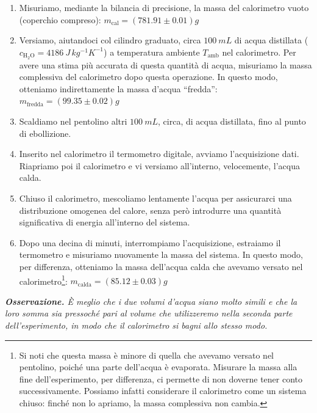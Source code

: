 \documentclass{article}
\begin{document}
\begin{enumerate}
    \item
        Misuriamo, mediante la bilancia di precisione, la massa del
        calorimetro vuoto (coperchio compreso):
        $m_\text{cal} = \left(781.91\pm0.01\right) \unit{g}$
    \item
        Versiamo, aiutandoci col cilindro graduato, circa $\qty{100}{mL}$
        di acqua distillata ($c_{\text{H}_2\text{O}}=\qty{4186}{J\,kg^{-1}K^{-1}}$)
        a temperatura ambiente $T_\text{amb}$ nel calorimetro.
        Per avere una stima più accurata di questa quantità di acqua,
        misuriamo la massa complessiva del calorimetro dopo questa operazione.
        In questo modo, otteniamo indirettamente la massa d'acqua “fredda”:
        $m_\text{fredda} = \left(99.35\pm0.02\right) \unit{g}$
    \item
        Scaldiamo nel pentolino altri $\qty{100}{mL}$, circa, di acqua distillata,
        fino al punto di ebollizione.
    \item
        Inserito nel calorimetro il termometro digitale, avviamo l'acquisizione dati.
        Riapriamo poi il calorimetro e vi versiamo all'interno,
        velocemente, l'acqua calda.
    \item
        Chiuso il calorimetro, mescoliamo lentamente l'acqua per assicurarci
        una distribuzione omogenea del calore, senza però introdurre una quantità
        significativa di energia all'interno del sistema.
    \item
        Dopo una decina di minuti, interrompiamo l'acquisizione, estraiamo il
        termometro e misuriamo nuovamente la massa del sistema.
        In questo modo, per differenza, otteniamo la massa dell'acqua calda che
        avevamo versato nel calorimetro\footnote{
        Si noti che questa massa è minore di quella che avevamo versato
        nel pentolino, poiché una parte dell'acqua è evaporata. Misurare la massa
        alla fine dell'esperimento, per differenza, ci permette di non doverne
        tener conto successivamente. Possiamo infatti considerare il calorimetro
        come un sistema chiuso: finché non lo apriamo, la massa complessiva
        non cambia.
        }:
        $m_\text{calda} = \left(85.12\pm0.03\right) \unit{g}$
\end{enumerate}

\emph{
\textbf{Osservazione.} È meglio che i due volumi d'acqua siano molto simili e che
la loro somma sia pressoché pari al volume che utilizzeremo nella seconda parte
dell'esperimento, in modo che il calorimetro si bagni allo stesso modo.
}
\end{document}
